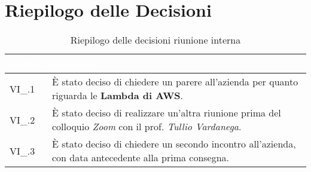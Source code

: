 \section{Riepilogo delle Decisioni}


\begin{table}[!htbp]
\renewcommand{\arraystretch}{1.5}
\begin{tabular}{m{}<{\centering}  m{}<{\centering}}
\rowcolor{darkblue} \textcolor{white}{\textbf{Codice}} & \textcolor{white}{\textbf{Decisione}} \\
\hline
VI\_\D{}.1 & È stato deciso di chiedere un parere all'azienda per quanto riguarda le \textbf{Lambda di AWS}.\\
\rowcolor{gray!10} VI\_\D{}.2 &  È stato deciso di realizzare un'altra riunione prima del colloquio \textit{Zoom} con il prof. \textit{Tullio Vardanega}.\\
VI\_\D{}.3 & È stato deciso di chiedere un secondo incontro all'azienda, con data antecedente alla prima consegna.\\
\end{tabular}
\caption{Riepilogo delle decisioni riunione interna \D{}}
\end{table}